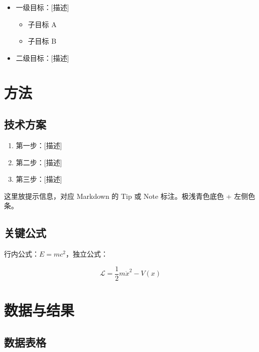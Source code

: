 \begin{itemize}
  \item 一级目标：[描述]
  \begin{itemize}
    \item 子目标 A
    \item 子目标 B
  \end{itemize}
  \item 二级目标：[描述]
\end{itemize}

\section{方法}

\subsection{技术方案}

\begin{enumerate}
  \item 第一步：[描述]
  \item 第二步：[描述]
  \item 第三步：[描述]
\end{enumerate}

\begin{tipbox}[💡 最佳实践]
  这里放提示信息，对应 Markdown 的 Tip 或 Note 标注。极浅青色底色 + 左侧色条。
\end{tipbox}

\subsection{关键公式}

行内公式：$E = mc^2$，独立公式：

\begin{equation}
  \mathcal{L} = \frac{1}{2}m\dot{x}^2 - V(x)
  \label{eq:example}
\end{equation}

\section{数据与结果}

\subsection{数据表格}

